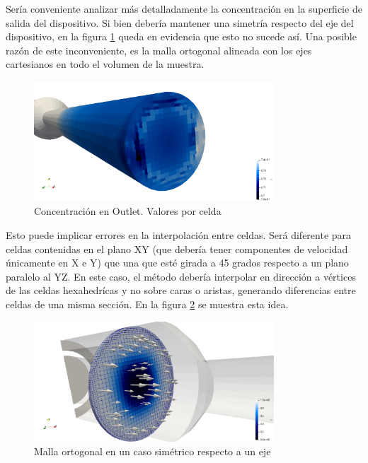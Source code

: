 \documentclass[oneside,a4paper,spanish,links]{amca}
\begin{document}
Sería conveniente analizar más detalladamente la concentración en la superficie de salida del dispositivo. Si bien debería mantener una simetría respecto del eje del dispositivo, en la figura  \ref{fg:05_outlet} queda en evidencia que esto no sucede así. Una posible razón de este inconveniente, es la malla ortogonal alineada con los ejes cartesianos en todo el volumen de la muestra. 

\begin{figure}[htb]
	\centerline{
		\includegraphics[width=0.8\textwidth]{Figuras/05_OUTLET_T.png}
	}
	\caption{Concentración en Outlet. Valores por celda} \label{fg:05_outlet}
\end{figure}

Esto puede implicar errores en la interpolación entre celdas. Será diferente para celdas contenidas en el plano XY (que debería tener componentes de velocidad únicamente en X e Y) que una que esté girada a 45 grados respecto a un plano paralelo al YZ. En este caso, el método debería interpolar en dirección a vértices de las celdas hexahedrícas y no sobre caras o aristas, generando diferencias entre celdas de una misma sección. En la figura \ref{fg:05_hexa_glyph} se muestra esta idea.


\begin{figure}[htb]
	\centerline{
		\includegraphics[width=0.8\textwidth]{Figuras/05_GLYPH_HEXA.png}
	}
	\caption{Malla ortogonal en un caso simétrico respecto a un eje} \label{fg:05_hexa_glyph}
\end{figure}
\end{document}
